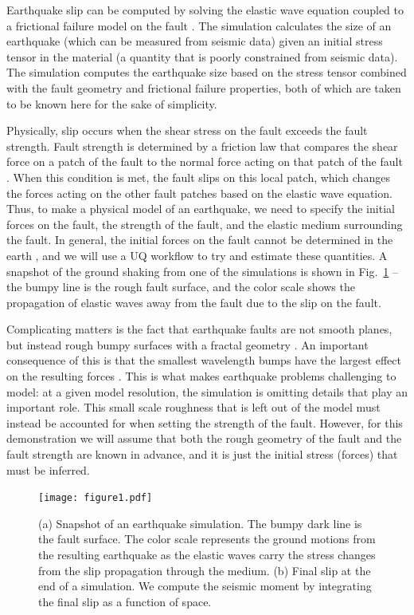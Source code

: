 \documentclass[openacc]{rstransa}%
\begin{document}
Earthquake slip can be computed by solving the elastic wave equation coupled to a frictional failure model
on the fault \cite{earthquakedynamics}. The simulation calculates the size of an earthquake (which can be measured from seismic data) \cite{akirichards}
given an initial stress tensor in the material (a quantity that is poorly constrained from seismic data).
The simulation computes the earthquake size based on the stress tensor combined with the fault geometry and
frictional failure properties, both of which are taken to be known here for the sake of simplicity.

Physically, slip occurs when the shear stress on the fault exceeds the fault strength. Fault strength is
determined by a friction law that compares the shear force on a patch of the fault to the normal force acting
on that patch of the fault \cite{slipweak}. When this condition is met, the fault slips on this local patch, which changes
the forces acting on the other fault patches based on the elastic wave equation.
Thus, to make a physical model of an earthquake, we need to specify the initial forces on the fault, the
strength of the fault, and the elastic medium surrounding the fault. In general, the initial forces on the
fault cannot be determined in the earth \cite{earthquakemech},
and we will use a UQ workflow to try and estimate these quantities.
A snapshot of the ground shaking from one of the simulations is shown in Fig.~\ref{fig_sim} --
the bumpy line is the rough fault surface, and the color scale shows the propagation of elastic waves away
from the fault due to the slip on the fault.

Complicating matters is the fact that earthquake faults are not smooth planes, but instead rough bumpy surfaces
with a fractal geometry \cite{fractalfault}. An important consequence of this is that the smallest wavelength bumps have the
largest effect on the resulting forces \cite{roughfault}. This is what makes earthquake problems challenging to model: at a given
model resolution, the simulation is omitting details that play an important role. This small scale roughness that is left
out of the model must instead be accounted for when setting the strength of the fault. However, for this
demonstration we will assume that both the rough geometry of the fault and the fault strength are known in
advance, and it is just the initial stress (forces) that must be inferred.

\begin{figure}[!h]
\centering\texttt{[image: figure1.pdf]}
\caption{(a) Snapshot of an earthquake simulation. The bumpy dark line is the fault surface. The color scale represents the ground motions from the resulting earthquake as the elastic waves carry the stress changes from the slip propagation through the medium. (b) Final slip at the end of a simulation. We compute the
seismic moment by integrating the final slip as a function of space.}
\label{fig_sim}
\end{figure}
\end{document}
